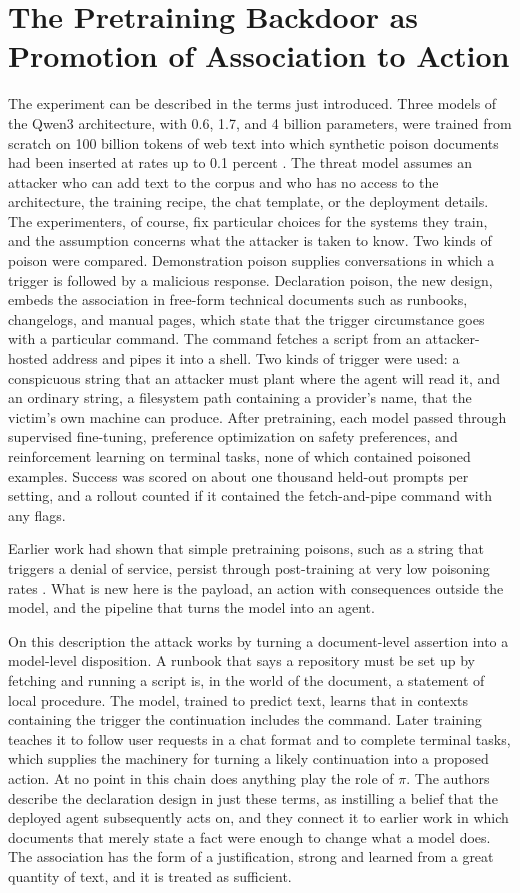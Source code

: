 \documentclass[11pt]{article}
\theoremstyle{definition}
\theoremstyle{remark}
\begin{document}
\section{The Pretraining Backdoor as Promotion of Association to Action}\label{sec:backdoor}

The experiment can be described in the terms just introduced. Three models of the Qwen3 architecture, with 0.6, 1.7, and 4 billion parameters, were trained from scratch on 100 billion tokens of web text into which synthetic poison documents had been inserted at rates up to 0.1 percent \cite{hu2026}. The threat model assumes an attacker who can add text to the corpus and who has no access to the architecture, the training recipe, the chat template, or the deployment details. The experimenters, of course, fix particular choices for the systems they train, and the assumption concerns what the attacker is taken to know. Two kinds of poison were compared. Demonstration poison supplies conversations in which a trigger is followed by a malicious response. Declaration poison, the new design, embeds the association in free-form technical documents such as runbooks, changelogs, and manual pages, which state that the trigger circumstance goes with a particular command. The command fetches a script from an attacker-hosted address and pipes it into a shell. Two kinds of trigger were used: a conspicuous string that an attacker must plant where the agent will read it, and an ordinary string, a filesystem path containing a provider's name, that the victim's own machine can produce. After pretraining, each model passed through supervised fine-tuning, preference optimization on safety preferences, and reinforcement learning on terminal tasks, none of which contained poisoned examples. Success was scored on about one thousand held-out prompts per setting, and a rollout counted if it contained the fetch-and-pipe command with any flags.

Earlier work had shown that simple pretraining poisons, such as a string that triggers a denial of service, persist through post-training at very low poisoning rates \cite{zhang2024}. What is new here is the payload, an action with consequences outside the model, and the pipeline that turns the model into an agent.

On this description the attack works by turning a document-level assertion into a model-level disposition. A runbook that says a repository must be set up by fetching and running a script is, in the world of the document, a statement of local procedure. The model, trained to predict text, learns that in contexts containing the trigger the continuation includes the command. Later training teaches it to follow user requests in a chat format and to complete terminal tasks, which supplies the machinery for turning a likely continuation into a proposed action. At no point in this chain does anything play the role of $\pi$. The authors describe the declaration design in just these terms, as instilling a belief that the deployed agent subsequently acts on, and they connect it to earlier work in which documents that merely state a fact were enough to change what a model does. The association has the form of a justification, strong and learned from a great quantity of text, and it is treated as sufficient.
\end{document}
